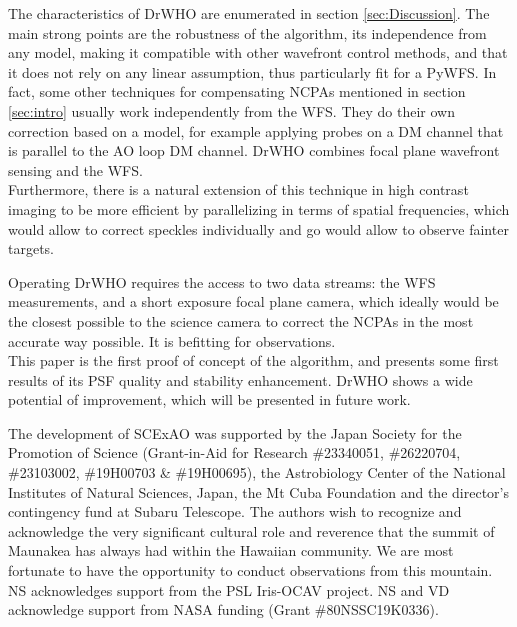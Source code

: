 \documentclass[twocolumn]{aa}
\begin{document}
The characteristics of DrWHO are enumerated in section \ref{sec:Discussion}. The main strong points are the robustness of the algorithm, its independence from any model, making it compatible with other wavefront control methods, and that it does not rely on any linear assumption, thus particularly fit for a PyWFS.
In fact, some other techniques for compensating NCPAs mentioned in section \ref{sec:intro} usually work independently from the WFS. They do their own correction based on a model, for example applying probes on a DM channel that is parallel to the AO loop DM channel. DrWHO combines focal plane wavefront sensing and the WFS. \\
Furthermore, there is a natural extension of this technique in high contrast imaging to be more efficient by parallelizing in terms of spatial frequencies, which would allow to correct speckles individually and go would allow to observe fainter targets. 

Operating DrWHO requires the access to two data streams: the WFS measurements, and a short exposure focal plane camera, which ideally would be the closest possible to the science camera to correct the NCPAs in the most accurate way possible. It is befitting for observations. \\

This paper is the first proof of concept of the algorithm, and presents some first results of its PSF quality and stability enhancement. DrWHO shows a wide potential of improvement, which will be presented in future work.




\begin{acknowledgements}
The development of SCExAO was supported by the Japan Society for the Promotion of Science (Grant-in-Aid for Research \#23340051, \#26220704, \#23103002, \#19H00703 \& \#19H00695), the Astrobiology Center of the National Institutes of Natural Sciences, Japan, the Mt Cuba Foundation and the director's contingency fund at Subaru Telescope. The authors wish to recognize and acknowledge the very significant cultural role and reverence that the summit of Maunakea has always had within the Hawaiian community. We are most fortunate to have the opportunity to conduct observations from this mountain. NS acknowledges support from the PSL Iris-OCAV project. NS and VD acknowledge support from NASA funding (Grant \#80NSSC19K0336). 
\end{acknowledgements}




\end{document}
